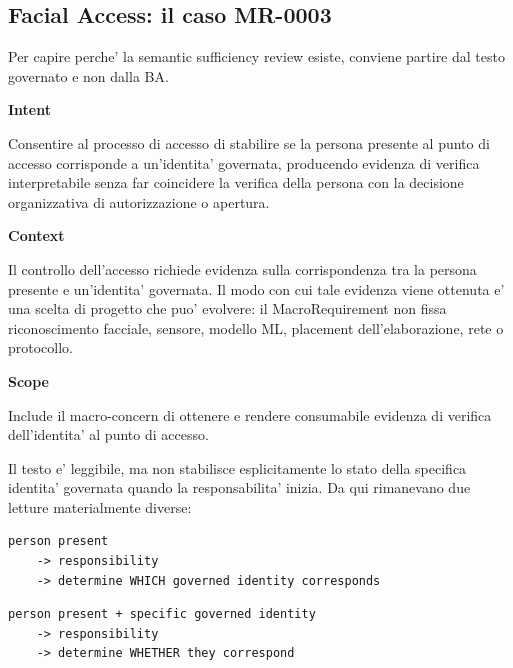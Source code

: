 \documentclass[11pt,a4paper]{article}
\begin{document}
\subsection{Facial Access: il caso MR-0003}

Per capire perche' la semantic sufficiency review esiste, conviene partire dal testo governato e non dalla BA.

\begin{sourcebox}
\textbf{Intent}

Consentire al processo di accesso di stabilire se la persona presente al punto di accesso corrisponde a un'identita' governata, producendo evidenza di verifica interpretabile senza far coincidere la verifica della persona con la decisione organizzativa di autorizzazione o apertura.

\medskip
\textbf{Context}

Il controllo dell'accesso richiede evidenza sulla corrispondenza tra la persona presente e un'identita' governata. Il modo con cui tale evidenza viene ottenuta e' una scelta di progetto che puo' evolvere: il MacroRequirement non fissa riconoscimento facciale, sensore, modello ML, placement dell'elaborazione, rete o protocollo.

\medskip
\textbf{Scope}

Include il macro-concern di ottenere e rendere consumabile evidenza di verifica dell'identita' al punto di accesso.
\end{sourcebox}

Il testo e' leggibile, ma non stabilisce esplicitamente lo stato della specifica identita' governata quando la responsabilita' inizia. Da qui rimanevano due letture materialmente diverse:

\begin{examplebox}
\begin{lstlisting}
person present
    -> responsibility
    -> determine WHICH governed identity corresponds
\end{lstlisting}
\end{examplebox}

\begin{examplebox}
\begin{lstlisting}
person present + specific governed identity
    -> responsibility
    -> determine WHETHER they correspond
\end{lstlisting}
\end{examplebox}
\end{document}
